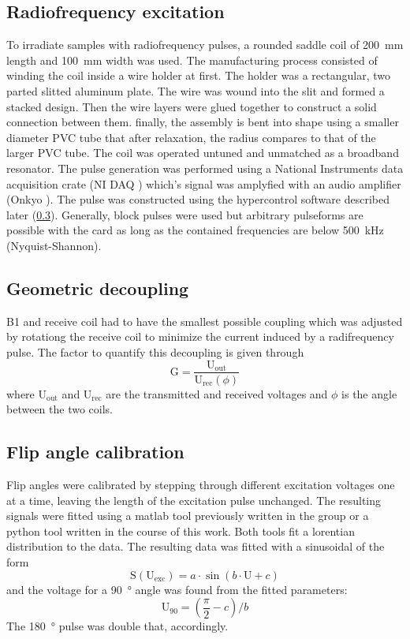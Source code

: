         \subsection{Radiofrequency excitation}
        To irradiate samples with radiofrequency pulses, a rounded saddle coil of \SI{200}{\mm} length and \SI{100}{\mm} width was used. The manufacturing process consisted of winding the coil inside a wire holder at first. The holder was a rectangular, two parted slitted aluminum plate. The wire was wound into the slit and formed a stacked design. Then the wire layers were glued together to construct a solid connection between them. finally, the assembly is bent into shape using a smaller diameter PVC tube that after relaxation, the radius compares to that of the larger PVC tube. The coil was operated untuned and unmatched as a broadband resonator. The pulse generation was performed using a National Instruments data acquisition crate (NI DAQ ) which's signal was amplyfied with an audio amplifier (Onkyo ).
        The pulse was constructed using the hypercontrol software described later (\ref{}). Generally, block pulses were used but arbitrary pulseforms are possible with the card as long as the contained frequencies are below \SI{500}{\kilo\hertz} (Nyquist-Shannon). 
        \subsection{Geometric decoupling}
            B1 and receive coil had to have the smallest possible coupling which was adjusted by rotationg the receive coil to minimize the current induced by a radifrequency pulse. The factor to quantify this decoupling is given through 
            \begin{equation}
            \mathrm{G}=\frac{\mathrm{U_{out}}}{\mathrm{U_{rec}}(\phi)}
            \end{equation}
            where $\mathrm{U_{out}}$ and $\mathrm{U_{rec}}$ are the transmitted and received voltages and $\phi$ is the angle between the two coils.
        \subsection{Flip angle calibration}
            Flip angles were calibrated by stepping through different excitation voltages one at a time, leaving the length of the excitation pulse unchanged. The resulting signals were fitted using a matlab tool previously written in the group or a python tool written in the course of this work. Both tools fit a lorentian distribution to the data.
            The resulting data was fitted with a sinusoidal of the form
            \begin{equation}
                \mathrm{S}(\mathrm{U_{exc}})= a \cdot \sin(b\cdot \mathrm{U} + c)
            \end{equation}
            and the voltage for a  \SI{90}{\degree} angle was found from the fitted parameters:
            \begin{equation}
                \mathrm{U}_{90} = (\frac{\pi}{2}-c)/b
            \end{equation}
            The \SI{180}{\degree} pulse was double that, accordingly.
